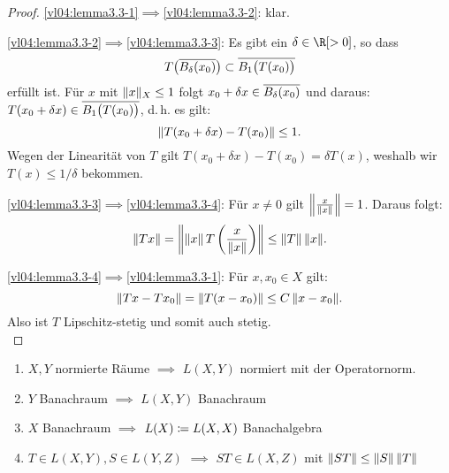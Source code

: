 \begin{proof}
    \ref{vl04:lemma3.3-1}$\implies$\ref{vl04:lemma3.3-2}: klar.
    
    \ref{vl04:lemma3.3-2}$\implies$\ref{vl04:lemma3.3-3}:
    Es gibt ein $\delta\in\R[>0]$, so dass
    \[ T\bigl( \setclosure{ B_\delta(x_0) } \bigr)
        \subset \setclosure{ B_1\bigl( T(x_0) \bigr) }
    \]
    erfüllt ist. Für $x$ mit $\norm{x}_X\leq 1$ folgt $x_0+\delta x\in
    \setclosure{ B_\delta(x_0) }$ und daraus: $T(x_0+\delta x) \in \setclosure{
    B_1\bigl(T(x_0)\bigr) }$, d.\,h. es gilt:
    \[ \norm{ T(x_0+\delta x) - T(x_0) } \leq 1 . \]
    Wegen der Linearität von $T$ gilt $T(x_0+\delta x) - T(x_0) = \delta
    T(x)$, weshalb wir $T(x)\leq 1/\delta$ bekommen.
    
    \ref{vl04:lemma3.3-3}$\implies$\ref{vl04:lemma3.3-4}: Für $x\neq 0$ gilt
    $\norm*{ \frac{x}{\norm{x}} } = 1$. Daraus folgt:
    \[ \norm{Tx} = \norm*{ \norm{x} \, T\left( \frac{x}{\norm{x}} \right) }
        \leq \norm{T} \, \norm{x}
    . \]
    
    \ref{vl04:lemma3.3-4}$\implies$\ref{vl04:lemma3.3-1}: 
    Für $x,x_0\in X$ gilt:
    \[ \norm{Tx-Tx_0} = \norm{T(x-x_0)} \leq C\,\norm{x-x_0}  . \]
    Also ist $T$ Lipschitz-stetig und somit auch stetig.
    \\
\end{proof}

\begin{thLemma}\hfill
    \begin{enumerate}[(1)]
        \item \label{vl04:lemma3.4-1}
            $X,Y$ normierte Räume $\implies$ $L(X,Y)$ normiert mit der
            Operatornorm.
        \item \label{vl04:lemma3.4-2}
            $Y$ Banachraum $\implies$ $L(X,Y)$ Banachraum
        \item \label{vl04:lemma3.4-3}
            $X$ Banachraum $\implies$ $L(X) \defeq L(X,X)$ Banachalgebra
        \item \label{vl04:lemma3.4-4}
            $T\in L(X,Y), S\in L(Y,Z)$ $\implies$ $ST\in L(X,Z)$ mit
            $\norm{ST}\leq\norm{S}\,\norm{T}$
    \end{enumerate}
\end{thLemma}

